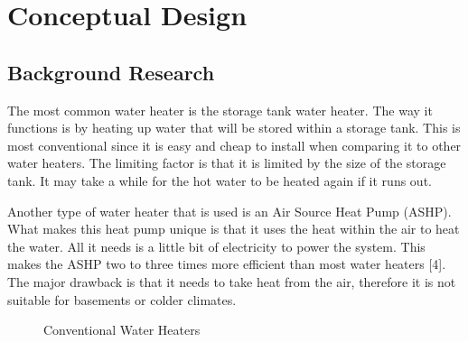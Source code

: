 \chapter{Conceptual Design}

\section{Background Research}

The most common water heater is the storage tank water heater. The way it functions is by heating up water that will be stored within a storage tank. This is most conventional since it is easy and cheap to install when comparing it to other water heaters. The limiting factor is that it is limited by the size of the storage tank. It may take a while for the hot water to be heated again if it runs out.

\medskip
Another type of water heater that is used is an Air Source Heat Pump (ASHP). What makes this heat pump unique is that it uses the heat within the air to heat the water. All it needs is a little bit of electricity to power the system. This makes the ASHP two to three times more efficient than most water heaters [4]. The major drawback is that it needs to take heat from the air, therefore it is not suitable for basements or colder climates.

\begin{figure}[ht]
    \centering
    \qquad
    \caption{Conventional Water Heaters}
\end{figure}

